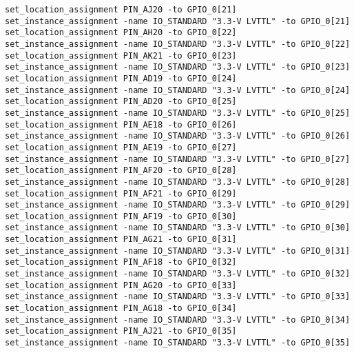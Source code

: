 \documentclass[dvipdfm]{book}
\begin{document}
\begin{verbatim}
set_location_assignment PIN_AJ20 -to GPIO_0[21]
set_instance_assignment -name IO_STANDARD "3.3-V LVTTL" -to GPIO_0[21]
set_location_assignment PIN_AH20 -to GPIO_0[22]
set_instance_assignment -name IO_STANDARD "3.3-V LVTTL" -to GPIO_0[22]
set_location_assignment PIN_AK21 -to GPIO_0[23]
set_instance_assignment -name IO_STANDARD "3.3-V LVTTL" -to GPIO_0[23]
set_location_assignment PIN_AD19 -to GPIO_0[24]
set_instance_assignment -name IO_STANDARD "3.3-V LVTTL" -to GPIO_0[24]
set_location_assignment PIN_AD20 -to GPIO_0[25]
set_instance_assignment -name IO_STANDARD "3.3-V LVTTL" -to GPIO_0[25]
set_location_assignment PIN_AE18 -to GPIO_0[26]
set_instance_assignment -name IO_STANDARD "3.3-V LVTTL" -to GPIO_0[26]
set_location_assignment PIN_AE19 -to GPIO_0[27]
set_instance_assignment -name IO_STANDARD "3.3-V LVTTL" -to GPIO_0[27]
set_location_assignment PIN_AF20 -to GPIO_0[28]
set_instance_assignment -name IO_STANDARD "3.3-V LVTTL" -to GPIO_0[28]
set_location_assignment PIN_AF21 -to GPIO_0[29]
set_instance_assignment -name IO_STANDARD "3.3-V LVTTL" -to GPIO_0[29]
set_location_assignment PIN_AF19 -to GPIO_0[30]
set_instance_assignment -name IO_STANDARD "3.3-V LVTTL" -to GPIO_0[30]
set_location_assignment PIN_AG21 -to GPIO_0[31]
set_instance_assignment -name IO_STANDARD "3.3-V LVTTL" -to GPIO_0[31]
set_location_assignment PIN_AF18 -to GPIO_0[32]
set_instance_assignment -name IO_STANDARD "3.3-V LVTTL" -to GPIO_0[32]
set_location_assignment PIN_AG20 -to GPIO_0[33]
set_instance_assignment -name IO_STANDARD "3.3-V LVTTL" -to GPIO_0[33]
set_location_assignment PIN_AG18 -to GPIO_0[34]
set_instance_assignment -name IO_STANDARD "3.3-V LVTTL" -to GPIO_0[34]
set_location_assignment PIN_AJ21 -to GPIO_0[35]
set_instance_assignment -name IO_STANDARD "3.3-V LVTTL" -to GPIO_0[35]


\end{verbatim}
\end{document}

